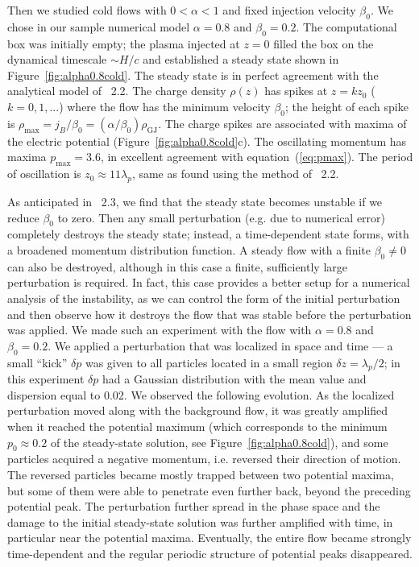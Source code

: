 Then we studied cold flows with $0<\alpha<1$ and fixed injection velocity $\beta_0$.
We chose in our sample numerical model $\alpha=0.8$ and $\beta_0=0.2$.
The computational box was initially empty; the plasma injected at $z=0$
filled the box on the dynamical timescale
$\sim H/c$ and established a steady state shown in Figure~\ref{fig:alpha0.8cold}.
The steady state is in perfect agreement with the analytical model of \Sect~2.2.
The charge density $\rho(z)$ has spikes at $z=kz_0$ ($k=0,1,...$) where
the flow has the minimum velocity $\beta_0$; the height of each spike is
$\rho_{\max}=j_B/\beta_0=(\alpha/\beta_0)\rho_\mathrm{GJ}$.
The charge spikes are associated with maxima of the electric potential (Figure~\ref{fig:alpha0.8cold}c).
The oscillating momentum has maxima $p_{\max}=3.6$, in excellent agreement
with equation~(\ref{eq:pmax}). The period of oscillation is $z_0\approx 11\lambda_p$, same
as found using the method of \Sect~2.2.

As anticipated in \Sect~2.3, we find that the steady state becomes unstable if we
reduce $\beta_0$ to zero. Then any small perturbation (e.g. due to numerical error)
completely destroys the steady state; instead, a time-dependent state forms, with a
broadened momentum distribution function.
A steady flow with a finite $\beta_0\neq 0$ can also be destroyed, although in this
case a finite,
sufficiently large perturbation is required. In fact, this case provides a better
setup for a numerical analysis of the instability,
as we can control the form of the initial perturbation and then observe how it destroys
the flow that was stable before the perturbation was applied.
We made such an experiment with the flow with $\alpha=0.8$ and $\beta_0=0.2$.
We applied a perturbation that was localized in space and time --- a small ``kick''
$\delta p$ was given to all particles located in a small region $\delta z=\lambda_p/2$;
in this experiment $\delta p$ had a Gaussian distribution with the mean value and
dispersion equal to 0.02.
We observed the following evolution. As the localized
perturbation moved along with the background flow, it was greatly amplified when it
reached the potential maximum (which corresponds to the minimum $p_0\approx 0.2$
of the steady-state solution,
see Figure~\ref{fig:alpha0.8cold}), and some particles acquired a negative momentum, i.e. reversed their
direction of motion. The reversed particles became mostly trapped between two
potential maxima, but some of them were able to penetrate even further back,
beyond the preceding potential peak. The perturbation further spread in the phase space
and the damage to the initial steady-state solution was further amplified with time,
in particular near the potential maxima.
Eventually, the entire flow became strongly time-dependent
and the regular periodic structure of potential peaks disappeared.

